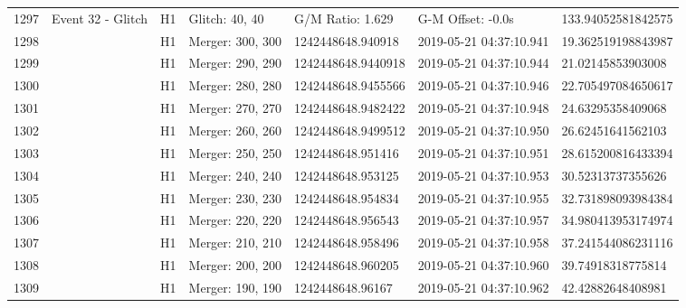 \begin{longtable}{lllllll}
1297 &                                  Event 32 - Glitch &       H1 &    Glitch: 40, 40 &    G/M Ratio: 1.629 &        G-M Offset: -0.0s &  133.94052581842575 \\
1298 &                                                    &       H1 &  Merger: 300, 300 &   1242448648.940918 &  2019-05-21 04:37:10.941 &  19.362519198843987 \\
1299 &                                                    &       H1 &  Merger: 290, 290 &  1242448648.9440918 &  2019-05-21 04:37:10.944 &   21.02145853903008 \\
1300 &                                                    &       H1 &  Merger: 280, 280 &  1242448648.9455566 &  2019-05-21 04:37:10.946 &  22.705497084650617 \\
1301 &                                                    &       H1 &  Merger: 270, 270 &  1242448648.9482422 &  2019-05-21 04:37:10.948 &   24.63295358409068 \\
1302 &                                                    &       H1 &  Merger: 260, 260 &  1242448648.9499512 &  2019-05-21 04:37:10.950 &   26.62451641562103 \\
1303 &                                                    &       H1 &  Merger: 250, 250 &   1242448648.951416 &  2019-05-21 04:37:10.951 &  28.615200816433394 \\
1304 &                                                    &       H1 &  Merger: 240, 240 &   1242448648.953125 &  2019-05-21 04:37:10.953 &   30.52313737355626 \\
1305 &                                                    &       H1 &  Merger: 230, 230 &   1242448648.954834 &  2019-05-21 04:37:10.955 &  32.731898093984384 \\
1306 &                                                    &       H1 &  Merger: 220, 220 &   1242448648.956543 &  2019-05-21 04:37:10.957 &  34.980413953174974 \\
1307 &                                                    &       H1 &  Merger: 210, 210 &   1242448648.958496 &  2019-05-21 04:37:10.958 &  37.241544086231116 \\
1308 &                                                    &       H1 &  Merger: 200, 200 &   1242448648.960205 &  2019-05-21 04:37:10.960 &   39.74918318775814 \\
1309 &                                                    &       H1 &  Merger: 190, 190 &    1242448648.96167 &  2019-05-21 04:37:10.962 &   42.42882648408981 \\

\end{longtable}
